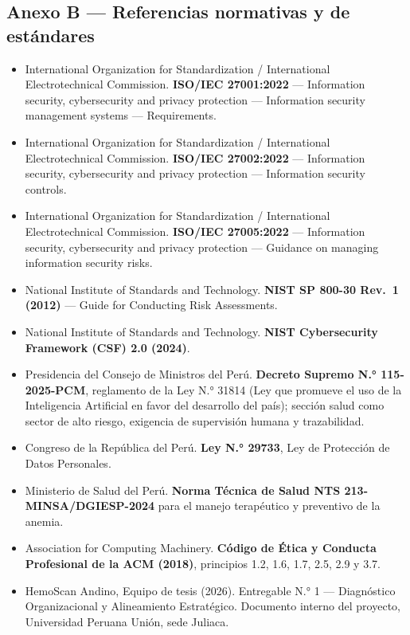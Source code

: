 \documentclass[11pt,a4paper]{article}
\providecommand{\tightlist}{%
  \setlength{\itemsep}{0pt}\setlength{\parskip}{0pt}}
\begin{document}
\subsection{Anexo B --- Referencias normativas y de estándares}\label{anexo-b-referencias-normativas-y-de-estuxe1ndares}

\begin{itemize}
\tightlist
\item
  International Organization for Standardization / International Electrotechnical Commission. \textbf{ISO/IEC 27001:2022} --- Information security, cybersecurity and privacy protection --- Information security management systems --- Requirements.
\item
  International Organization for Standardization / International Electrotechnical Commission. \textbf{ISO/IEC 27002:2022} --- Information security, cybersecurity and privacy protection --- Information security controls.
\item
  International Organization for Standardization / International Electrotechnical Commission. \textbf{ISO/IEC 27005:2022} --- Information security, cybersecurity and privacy protection --- Guidance on managing information security risks.
\item
  National Institute of Standards and Technology. \textbf{NIST SP 800-30 Rev.~1 (2012)} --- Guide for Conducting Risk Assessments.
\item
  National Institute of Standards and Technology. \textbf{NIST Cybersecurity Framework (CSF) 2.0 (2024)}.
\item
  Presidencia del Consejo de Ministros del Perú. \textbf{Decreto Supremo N.° 115-2025-PCM}, reglamento de la Ley N.° 31814 (Ley que promueve el uso de la Inteligencia Artificial en favor del desarrollo del país); sección salud como sector de alto riesgo, exigencia de supervisión humana y trazabilidad.
\item
  Congreso de la República del Perú. \textbf{Ley N.° 29733}, Ley de Protección de Datos Personales.
\item
  Ministerio de Salud del Perú. \textbf{Norma Técnica de Salud NTS 213-MINSA/DGIESP-2024} para el manejo terapéutico y preventivo de la anemia.
\item
  Association for Computing Machinery. \textbf{Código de Ética y Conducta Profesional de la ACM (2018)}, principios 1.2, 1.6, 1.7, 2.5, 2.9 y 3.7.
\item
  HemoScan Andino, Equipo de tesis (2026). Entregable N.° 1 --- Diagnóstico Organizacional y Alineamiento Estratégico. Documento interno del proyecto, Universidad Peruana Unión, sede Juliaca.

\end{itemize}
\end{document}
